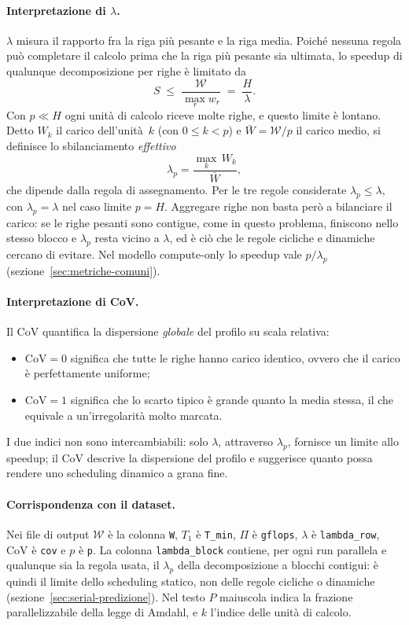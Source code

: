 \paragraph{Interpretazione di $\lambda$.}
$\lambda$ misura il rapporto fra la riga più pesante e la riga media. Poiché
nessuna regola può completare il calcolo prima che la riga più pesante sia
ultimata, lo speedup di qualunque decomposizione per righe è limitato da
%
\[
    S \;\le\; \frac{\mathcal{W}}{\max_r w_r} \;=\; \frac{H}{\lambda}.
\]
%
Con $p \ll H$ ogni unità di calcolo riceve molte righe, e questo limite è
lontano. Detto $W_k$ il carico dell'unità~$k$ (con $0 \le k < p$) e
$\bar{W} = \mathcal{W}/p$ il carico medio, si definisce lo sbilanciamento
\emph{effettivo}
%
\begin{equation}
    \lambda_p = \frac{\max_k\, W_k}{\bar{W}},
    \label{eq:lambdaP}
\end{equation}
%
che dipende dalla regola di assegnamento. Per le tre regole considerate
$\lambda_p \le \lambda$, con $\lambda_p = \lambda$ nel caso limite $p = H$.
Aggregare righe non basta però a bilanciare il carico: se le righe pesanti sono
contigue, come in questo problema, finiscono nello stesso blocco e $\lambda_p$
resta vicino a $\lambda$, ed è ciò che le regole cicliche e dinamiche cercano di
evitare. Nel modello compute-only lo speedup vale $p/\lambda_p$
(sezione~\ref{sec:metriche-comuni}).

\paragraph{Interpretazione di CoV.}
Il $\mathrm{CoV}$ quantifica la dispersione \emph{globale} del profilo su scala
relativa:
\begin{itemize}
    \item $\mathrm{CoV} = 0$ significa che tutte le righe hanno carico identico, ovvero che il carico è perfettamente uniforme;
    \item $\mathrm{CoV} = 1$ significa che lo scarto tipico è grande quanto la media stessa, il che equivale a un'irregolarità molto marcata.
\end{itemize}
\vspace{3mm}
I due indici non sono intercambiabili: solo $\lambda$, attraverso $\lambda_p$,
fornisce un limite allo speedup; il $\mathrm{CoV}$ descrive la dispersione del
profilo e suggerisce quanto possa rendere uno scheduling dinamico a grana fine.

\paragraph{Corrispondenza con il dataset.}
Nei file di output $\mathcal{W}$ è la colonna \texttt{W}, $T_1$ è
\texttt{T\_min}, $\Pi$ è \texttt{gflops}, $\lambda$ è \texttt{lambda\_row},
$\mathrm{CoV}$ è \texttt{cov} e $p$ è \texttt{p}. La colonna
\texttt{lambda\_block} contiene, per ogni run parallela e qualunque sia la regola
usata, il $\lambda_p$ della decomposizione a blocchi contigui: è quindi il limite
dello scheduling statico, non delle regole cicliche o dinamiche
(sezione~\ref{sec:serial-predizione}). Nel testo $P$ maiuscola indica la
frazione parallelizzabile della legge di Amdahl, e $k$ l'indice delle unità di
calcolo.

